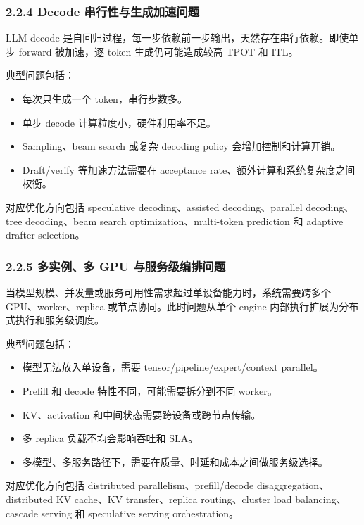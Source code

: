 \documentclass[a4paper,twocolumn,10pt]{ctexart}
\begin{document}
\subsubsection{2.2.4 Decode 串行性与生成加速问题}

LLM decode 是自回归过程，每一步依赖前一步输出，天然存在串行依赖。即使单步 forward 被加速，逐 token 生成仍可能造成较高 TPOT 和 ITL。


典型问题包括：


\begin{itemize}
\item 每次只生成一个 token，串行步数多。

\item 单步 decode 计算粒度小，硬件利用率不足。

\item Sampling、beam search 或复杂 decoding policy 会增加控制和计算开销。

\item Draft/verify 等加速方法需要在 acceptance rate、额外计算和系统复杂度之间权衡。

\end{itemize}
对应优化方向包括 speculative decoding、assisted decoding、parallel decoding、tree decoding、beam search optimization、multi-token prediction 和 adaptive drafter selection。




\subsubsection{2.2.5 多实例、多 GPU 与服务级编排问题}

当模型规模、并发量或服务可用性需求超过单设备能力时，系统需要跨多个 GPU、worker、replica 或节点协同。此时问题从单个 engine 内部执行扩展为分布式执行和服务级调度。


典型问题包括：


\begin{itemize}
\item 模型无法放入单设备，需要 tensor/pipeline/expert/context parallel。

\item Prefill 和 decode 特性不同，可能需要拆分到不同 worker。

\item KV、activation 和中间状态需要跨设备或跨节点传输。

\item 多 replica 负载不均会影响吞吐和 SLA。

\item 多模型、多服务路径下，需要在质量、时延和成本之间做服务级选择。

\end{itemize}
对应优化方向包括 distributed parallelism、prefill/decode disaggregation、distributed KV cache、KV transfer、replica routing、cluster load balancing、cascade serving 和 speculative serving orchestration。
\end{document}
